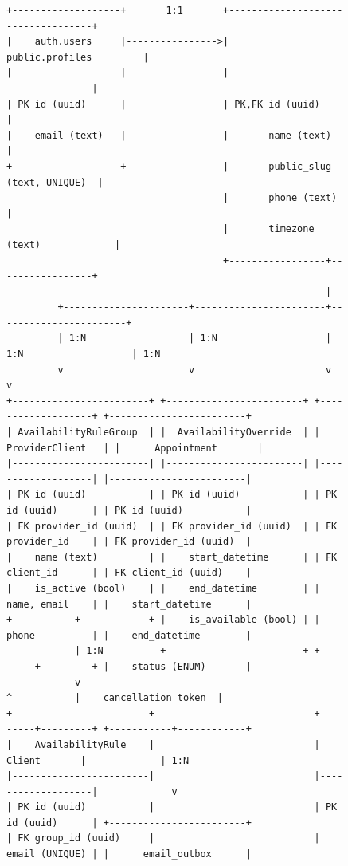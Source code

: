 \documentclass[12pt,a4paper]{article}
\begin{document}
\begin{figure}[hbt]
\centering
\begin{lstlisting}
+-------------------+       1:1       +-----------------------------------+
|    auth.users     |---------------->|           public.profiles         |
|-------------------|                 |-----------------------------------|
| PK id (uuid)      |                 | PK,FK id (uuid)                   |
|    email (text)   |                 |       name (text)                 |
+-------------------+                 |       public_slug (text, UNIQUE)  |
                                      |       phone (text)                |
                                      |       timezone (text)             |
                                      +-----------------+-----------------+
                                                        |
         +----------------------+-----------------------+-----------------------+
         | 1:N                  | 1:N                   | 1:N                   | 1:N
         v                      v                       v                       v
+------------------------+ +------------------------+ +-------------------+ +------------------------+
| AvailabilityRuleGroup  | |  AvailabilityOverride  | |  ProviderClient   | |      Appointment       |
|------------------------| |------------------------| |-------------------| |------------------------|
| PK id (uuid)           | | PK id (uuid)           | | PK id (uuid)      | | PK id (uuid)           |
| FK provider_id (uuid)  | | FK provider_id (uuid)  | | FK provider_id    | | FK provider_id (uuid)  |
|    name (text)         | |    start_datetime      | | FK client_id      | | FK client_id (uuid)    |
|    is_active (bool)    | |    end_datetime        | |    name, email    | |    start_datetime      |
+-----------+------------+ |    is_available (bool) | |    phone          | |    end_datetime        |
            | 1:N          +------------------------+ +---------+---------+ |    status (ENUM)       |
            v                                                   ^           |    cancellation_token  |
+------------------------+                            +---------+---------+ +-----------+------------+
|    AvailabilityRule    |                            |      Client       |             | 1:N
|------------------------|                            |-------------------|             v
| PK id (uuid)           |                            | PK id (uuid)      | +------------------------+
| FK group_id (uuid)     |                            |    email (UNIQUE) | |      email_outbox      |

\end{lstlisting}
\end{figure}
\end{document}
